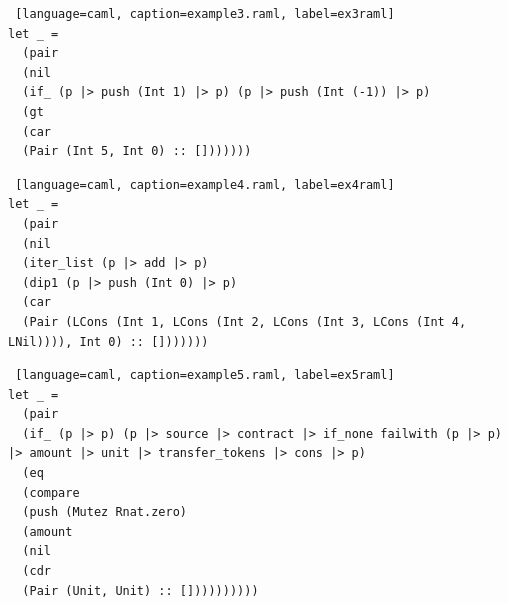 \documentclass{kuisthesis}
\begin{document}
\begin{lstlisting} [language=caml, caption=example3.raml, label=ex3raml]
let _ =
  (pair
  (nil
  (if_ (p |> push (Int 1) |> p) (p |> push (Int (-1)) |> p)
  (gt
  (car
  (Pair (Int 5, Int 0) :: []))))))
\end{lstlisting}

\begin{lstlisting} [language=caml, caption=example4.raml, label=ex4raml]
let _ =
  (pair
  (nil
  (iter_list (p |> add |> p)
  (dip1 (p |> push (Int 0) |> p)
  (car
  (Pair (LCons (Int 1, LCons (Int 2, LCons (Int 3, LCons (Int 4, LNil)))), Int 0) :: []))))))
\end{lstlisting}

\begin{lstlisting} [language=caml, caption=example5.raml, label=ex5raml]
let _ =
  (pair
  (if_ (p |> p) (p |> source |> contract |> if_none failwith (p |> p) |> amount |> unit |> transfer_tokens |> cons |> p)
  (eq
  (compare
  (push (Mutez Rnat.zero)
  (amount
  (nil
  (cdr
  (Pair (Unit, Unit) :: [])))))))))
\end{lstlisting}
\end{document}
